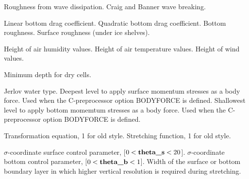 \begin{klist}
\begin{klist}
        Roughness from wave dissipation.
        Craig and Banner wave breaking.
     \end{klist}
    \mbox{}
     \begin{klist}
            Linear bottom drag coefficient.
           Quadratic bottom drag coefficient.
              Bottom roughness.
              Surface roughness (under ice shelves).
     \end{klist}
    \mbox{}
     \begin{klist}
        Height of air humidity values.
        Height of air temperature values.
        Height of wind values.
     \end{klist}
    \mbox{}
     \begin{klist}
         Minimum depth for dry cells.
     \end{klist}
    \mbox{}
     \begin{klist}
         Jerlov water type.
         Deepest level to apply surface momentum
     stresses as a body force.
            Used when the C-preprocessor option BODYFORCE is defined.
         Shallowest level to apply bottom momemtum
    stresses as a body force.
            Used when the C-preprocessor option BODYFORCE is defined.
     \end{klist}
    \mbox{}
     \begin{klist}
        Transformation equation, 1 for old style.
        Stretching function, 1 for old style.
     \end{klist}
    \mbox{}
     \begin{klist}
         $\sigma$-coordinate surface control parameter,
     [$0 < \mbox{\bf theta\_s} < 20$].
         $\sigma$-coordinate bottom  control parameter,
     [$0 < \mbox{\bf theta\_b} < 1$].
          Width of the surface or bottom boundary layer
     in which higher vertical resolution is required during stretching.
     \end{klist}
    \mbox{}
     \begin{klist}

\end{klist}
\end{klist}
